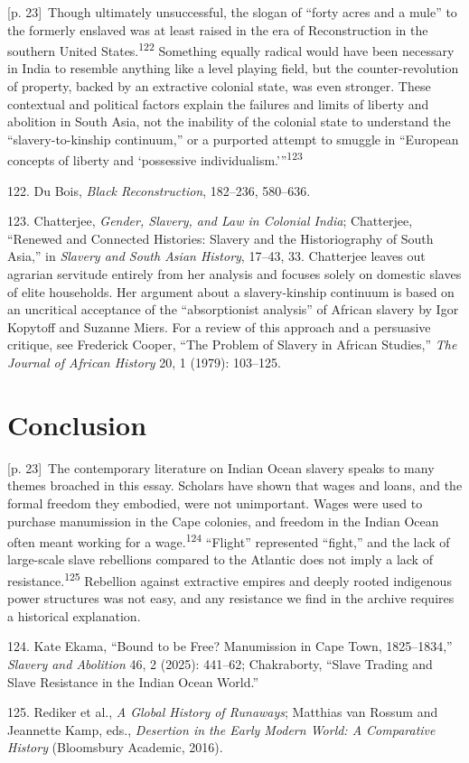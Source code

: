 \documentclass[10pt,a4paper]{article}
\begin{document}
{\scriptsize\color{gray} [p. 23]}\ Though ultimately unsuccessful, the slogan of “forty acres and a mule” to the formerly enslaved was at least raised in the era of Reconstruction in the southern United States.\nobreak\textsuperscript{122} Something equally radical would have been necessary in India to resemble anything like a level playing field, but the counter-revolution of property, backed by an extractive colonial state, was even stronger. These contextual and political factors explain the failures and limits of liberty and abolition in South Asia, not the inability of the colonial state to understand the “slavery-to-kinship continuum,” or a purported attempt to smuggle in “European concepts of liberty and ‘possessive individualism.’”\nobreak\textsuperscript{123}\par{\small 122. Du Bois, \textit{Black Reconstruction}, 182–236, 580–636.\par}{\small 123. Chatterjee, \textit{Gender, Slavery, and Law in Colonial India}; Chatterjee, “Renewed and Connected Histories: Slavery and the Historiography of South Asia,” in \textit{Slavery and South Asian History}, 17–43, 33. Chatterjee leaves out agrarian servitude entirely from her analysis and focuses solely on domestic slaves of elite households. Her argument about a slavery-kinship continuum is based on an uncritical acceptance of the “absorptionist analysis” of African slavery by Igor Kopytoff and Suzanne Miers. For a review of this approach and a persuasive critique, see Frederick Cooper, “The Problem of Slavery in African Studies,” \textit{The Journal of African History} 20, 1 (1979): 103–125.\par}
\section*{Conclusion}
{\scriptsize\color{gray} [p. 23]}\ The contemporary literature on Indian Ocean slavery speaks to many themes broached in this essay. Scholars have shown that wages and loans, and the formal freedom they embodied, were not unimportant. Wages were used to purchase manumission in the Cape colonies, and freedom in the Indian Ocean often meant working for a wage.\nobreak\textsuperscript{124} “Flight” represented “fight,” and the lack of large-scale slave rebellions compared to the Atlantic does not imply a lack of resistance.\nobreak\textsuperscript{125} Rebellion against extractive empires and deeply rooted indigenous power structures was not easy, and any resistance we find in the archive requires a historical explanation.\par{\small 124. Kate Ekama, “Bound to be Free? Manumission in Cape Town, 1825–1834,” \textit{Slavery and Abolition} 46, 2 (2025): 441–62; Chakraborty, “Slave Trading and Slave Resistance in the Indian Ocean World.”\par}{\small 125. Rediker et al., \textit{A Global History of Runaways}; Matthias van Rossum and Jeannette Kamp, eds., \textit{Desertion in the Early Modern World: A Comparative History} (Bloomsbury Academic, 2016).\par}
\end{document}
